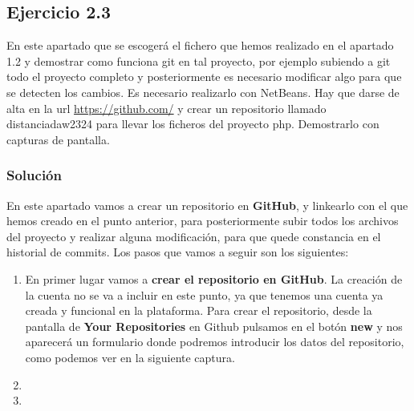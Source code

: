 \subsection{Ejercicio 2.3}
En este apartado que se escogerá el fichero que hemos realizado en el apartado 1.2 y demostrar como funciona git en tal proyecto, por ejemplo subiendo a git todo el proyecto completo y posteriormente es necesario modificar algo para que se detecten los cambios. Es necesario realizarlo con NetBeans. Hay que darse de alta en la url \url{https://github.com/} y crear un repositorio llamado distanciadaw2324 para llevar los ficheros del proyecto php. Demostrarlo con capturas de pantalla.

\subsubsection{Solución}
En este apartado vamos a crear un repositorio en \textbf{GitHub}, y linkearlo con el que hemos creado en el punto anterior, para posteriormente subir todos los archivos del proyecto y realizar alguna modificación, para que quede constancia en el historial de commits. Los pasos que vamos a seguir son los siguientes:

\begin{enumerate}
    \item En primer lugar vamos a \textbf{crear el repositorio en GitHub}. La creación de la cuenta no se va a incluir en este punto, ya que tenemos una cuenta ya creada y funcional en la plataforma. Para crear el repositorio, desde la pantalla de \textbf{Your Repositories} en Github pulsamos en el botón \textbf{new} y nos aparecerá un formulario donde podremos introducir los datos del repositorio, como podemos ver en la siguiente captura.
    \item
    \item
\end{enumerate}

%

